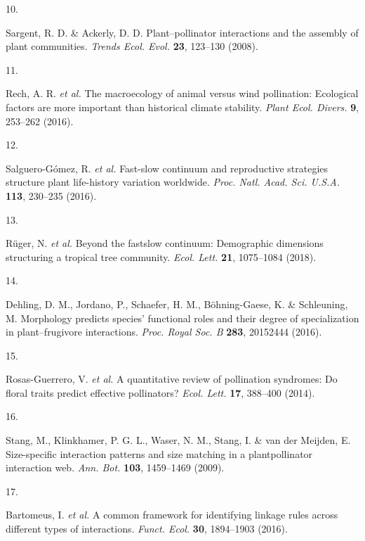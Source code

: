 \documentclass[
  12pt,
  a4paper,
]{article}
\newlength{\cslhangindent}
\newlength{\csllabelwidth}
\newlength{\cslentryspacingunit} %
\newenvironment{CSLReferences}[2] %
 {%
  \setlength{\parindent}{0pt}
  \ifodd #1
  \let\oldpar\par
  \def\par{\hangindent=\cslhangindent\oldpar}
  \fi
  \setlength{\parskip}{#2\cslentryspacingunit}
 }%
 {}
\newcommand{\CSLLeftMargin}[1]{\parbox[t]{\csllabelwidth}{#1}}
\newcommand{\CSLRightInline}[1]{\parbox[t]{\linewidth - \csllabelwidth}{#1}\break}
\begin{document}
\begin{CSLReferences}{0}{0}
\leavevmode{}%
\CSLLeftMargin{10. }
\CSLRightInline{Sargent, R. D. \& Ackerly, D. D. Plant--pollinator interactions and the assembly of plant communities. \emph{Trends Ecol. Evol.} \textbf{23}, 123--130 (2008).}

\leavevmode{}%
\CSLLeftMargin{11. }
\CSLRightInline{Rech, A. R. \emph{et al.} The macroecology of animal versus wind pollination: Ecological factors are more important than historical climate stability. \emph{Plant Ecol. Divers.} \textbf{9}, 253--262 (2016).}

\leavevmode{}%
\CSLLeftMargin{12. }
\CSLRightInline{Salguero-Gómez, R. \emph{et al.} Fast-slow continuum and reproductive strategies structure plant life-history variation worldwide. \emph{Proc. Natl. Acad. Sci. U.S.A.} \textbf{113}, 230--235 (2016).}

\leavevmode{}%
\CSLLeftMargin{13. }
\CSLRightInline{Rüger, N. \emph{et al.} Beyond the fast\textendash slow continuum: Demographic dimensions structuring a tropical tree community. \emph{Ecol. Lett.} \textbf{21}, 1075--1084 (2018).}

\leavevmode{}%
\CSLLeftMargin{14. }
\CSLRightInline{Dehling, D. M., Jordano, P., Schaefer, H. M., Böhning-Gaese, K. \& Schleuning, M. Morphology predicts species' functional roles and their degree of specialization in plant--frugivore interactions. \emph{Proc. Royal Soc. B} \textbf{283}, 20152444 (2016).}

\leavevmode{}%
\CSLLeftMargin{15. }
\CSLRightInline{Rosas-Guerrero, V. \emph{et al.} A quantitative review of pollination syndromes: Do floral traits predict effective pollinators? \emph{Ecol. Lett.} \textbf{17}, 388--400 (2014).}

\leavevmode{}%
\CSLLeftMargin{16. }
\CSLRightInline{Stang, M., Klinkhamer, P. G. L., Waser, N. M., Stang, I. \& van der Meijden, E. Size-specific interaction patterns and size matching in a plant\textendash pollinator interaction web. \emph{Ann. Bot.} \textbf{103}, 1459--1469 (2009).}

\leavevmode{}%
\CSLLeftMargin{17. }
\CSLRightInline{Bartomeus, I. \emph{et al.} A common framework for identifying linkage rules across different types of interactions. \emph{Funct. Ecol.} \textbf{30}, 1894--1903 (2016).}


\end{CSLReferences}
\end{document}
